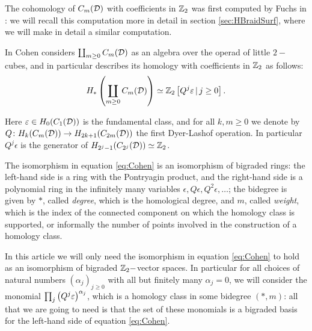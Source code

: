 The cohomology of $C_m(\mathcal{D})$ with coefficients in $\mathbb{Z}_2$ was first computed by Fuchs in
\cite{Fuchs:CohomBraidModtwo}: we will recall this computation more in detail in section
\ref{sec:HBraidSurf}, where we will make in detail a similar computation.

In \cite[Chap.III]{CLM} Cohen considers $\coprod_{m\geq 0}C_m(\mathcal{D})$ as an
algebra over the operad of little $2-$cubes, and in particular describes its
homology with coefficients in $\mathbb{Z}_2$ as follows:
\begin{equation}
 \label{eq:Cohen}
H_*\left(\coprod_{m\geq 0}C_m(\mathcal{D})\right)\simeq \mathbb{Z}_2\left[Q^j\varepsilon \, |\, j\geq 0\right].
\end{equation}

Here $\varepsilon\in H_0(C_1(\mathcal{D}))$ is the fundamental class, and for all
$k,m\geq 0$ we denote by $Q\colon H_k(C_m(\mathcal{D}))\to H_{2k+1}(C_{2m}(\mathcal{D}))$
the first Dyer-Lashof operation. In particular $Q^j\epsilon$ is the generator of
$H_{2^j-1}(C_{2^j}(\mathcal{D}))\simeq\mathbb{Z}_2$.

The isomorphism in equation \ref{eq:Cohen} is
an isomorphism of bigraded rings: the left-hand side is a ring with the Pontryagin product,
and the right-hand side is a polynomial ring in the infinitely many variables $\epsilon,Q\epsilon,Q^2\epsilon,\dots$;
the bidegree is given by
$*$, called \emph{degree}, which is the homological degree,
and $m$, called \emph{weight}, which is the index of the connected component
on which the homology class is supported, or informally the number of points
involved in the construction of a homology class.

In this article we will only need the isomorphism in equation \ref{eq:Cohen} to hold as
an isomorphism of bigraded $\mathbb{Z}_2-$vector spaces.
In particular for all choices of natural numbers $(\alpha_j)_{j\geq 0}$ with all but finitely
many $\alpha_j=0$, we will consider the monomial $\prod_j\left(Q^j\varepsilon\right)^{\alpha_j}$, which is
a homology class in some bidegree $(*,m)$: all that
we are going to need is that the set of these monomials is a bigraded basis for the
left-hand side of equation \ref{eq:Cohen}.